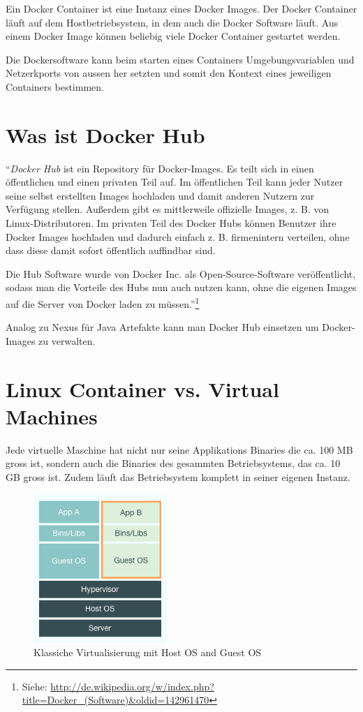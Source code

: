 Ein Docker Container ist eine Instanz eines Docker Images. Der Docker Container läuft
auf dem Hostbetriebsystem, in dem auch die Docker Software läuft. Aus einem Docker Image
können beliebig viele Docker Container gestartet werden.

Die Dockersoftware kann beim starten eines Containers Umgebungsvariablen und Netzerkports
von aussen her setzten und somit den Kontext eines jeweiligen Containers bestimmen.

\section{Was ist Docker Hub}

“\textit{Docker Hub} ist ein Repository für Docker-Images. Es teilt sich in einen öffentlichen
und einen privaten Teil auf. Im öffentlichen Teil kann jeder Nutzer seine selbst erstellten
Images hochladen und damit anderen Nutzern zur Verfügung stellen. Außerdem gibt es mittlerweile
offizielle Images, z. B. von Linux-Distributoren. Im privaten Teil des Docker Hubs können
Benutzer ihre Docker Images hochladen und dadurch einfach z. B. firmenintern verteilen, ohne
dass diese damit sofort öffentlich auffindbar sind.

Die Hub Software wurde von Docker Inc. als Open-Source-Software veröffentlicht, sodass
man die Vorteile des Hubs nun auch nutzen kann, ohne die eigenen Images auf die Server
von Docker laden zu müssen.”\footnote{Siehe: \url{http://de.wikipedia.org/w/index.php?title=Docker_(Software)&oldid=142961470}}

Analog zu Nexus für Java Artefakte kann man Docker Hub einsetzen um Docker-Images
zu verwalten.

\section{Linux Container vs. Virtual Machines}

Jede virtuelle Maschine hat nicht nur seine Applikations Binaries die ca. 100 MB gross ist, sondern
auch die Binaries des gesammten Betriebsystems, das ca. 10 GB gross ist. Zudem läuft das Betriebsystem
komplett in seiner eigenen Instanz.

\begin{figure}[htbp]
  \begin{center}
    \includegraphics[width=0.45\textwidth]{./images/classic_virtual_machine.png}
    \caption{Klassiche Virtualisierung mit Host OS and Guest OS}
    \label{img:classic_virtual_machine}
  \end{center}
\end{figure}

